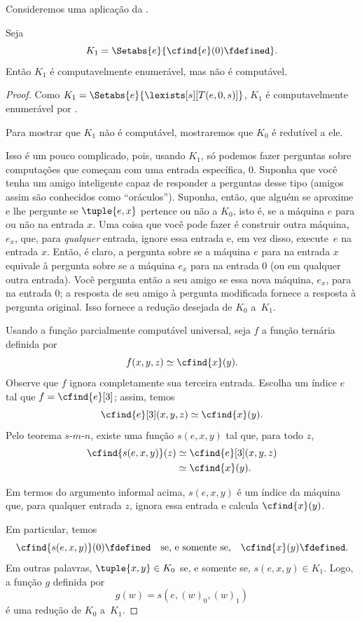 \documentclass[../../../include/open-logic-section]{subfiles}
\begin{document}

Consideremos uma aplicação da .

\begin{prop}
Seja
\[
K_1 = \Setabs{e}{\cfind{e}(0) \fdefined}.
\]
Então $K_1$ é computavelmente enumerável, mas não é computável.
\end{prop}

\begin{proof}
Como $K_1 = \Setabs{e}{\lexists[s][T(e,0,s)]}$, $K_1$ é computavelmente
enumerável por .

Para mostrar que $K_1$ não é computável, mostraremos que $K_0$ é
redutível a ele.

\begin{explain}
Isso é um pouco complicado, pois, usando $K_1$, só podemos fazer
perguntas sobre computações que começam com uma entrada específica,
$0$. Suponha que você tenha um amigo inteligente capaz de responder
a perguntas desse tipo (amigos assim são conhecidos como
``oráculos''). Suponha, então, que alguém se aproxime e lhe pergunte
se $\tuple{e, x}$ pertence ou não a $K_0$, isto é, se a máquina $e$
para ou não na entrada $x$. Uma coisa que você pode fazer é construir
outra máquina, $e_x$, que, para \emph{qualquer} entrada, ignore essa
entrada e, em vez disso, execute~$e$ na entrada $x$. Então, é claro,
a pergunta sobre se a máquina $e$ para na entrada $x$ equivale à
pergunta sobre se a máquina $e_x$ para na entrada $0$ (ou em qualquer
outra entrada). Você pergunta então a seu amigo se essa nova máquina,
$e_x$, para na entrada $0$; a resposta de seu amigo à pergunta
modificada fornece a resposta à pergunta original. Isso fornece a
redução desejada de $K_0$ a~$K_1$.
\end{explain}

Usando a função parcialmente computável universal, seja $f$
a função ternária definida por
\[
f(x,y,z) \simeq \cfind{x}(y).
\]
Observe que $f$ ignora completamente sua terceira entrada. Escolha um
índice $e$ tal que $f = \cfind{e}[3]$; assim, temos
\[
\cfind{e}[3](x,y,z) \simeq \cfind{x}(y).
\]
Pelo teorema $s$-$m$-$n$, existe uma função $s(e,x,y)$ tal que, para
todo $z$,
\begin{align*}
\cfind{s(e,x,y)}(z) & \simeq \cfind{e}[3](x,y,z) \\
& \simeq \cfind{x}(y).
\end{align*}

\begin{explain}
Em termos do argumento informal acima, $s(e,x,y)$ é um índice da
máquina que, para qualquer entrada $z$, ignora essa entrada e calcula
$\cfind{x}(y)$.
\end{explain}

Em particular, temos
\[
\cfind{s(e,x,y)}(0) \fdefined \quad \text{se, e somente se,} \quad
\cfind{x}(y) \fdefined.
\]
Em outras palavras, $\tuple{x, y} \in K_0$ se, e somente se,
$s(e,x,y) \in K_1$. Logo, a função $g$ definida por
\[
g(w) = s(e,(w)_0,(w)_1)
\]
é uma redução de $K_0$ a~$K_1$.
\end{proof}
\end{document}
